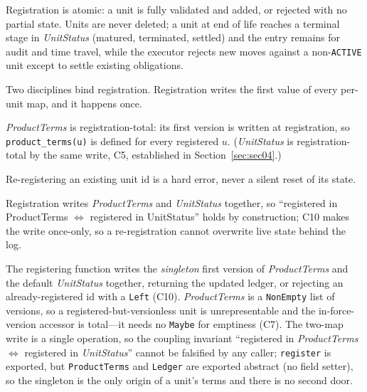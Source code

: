 Registration is atomic: a unit is fully validated and added, or rejected with no partial state. Units are never deleted; a unit at end of life reaches a terminal stage in \emph{UnitStatus} (matured, terminated, settled) and the entry remains for audit and time travel, while the executor rejects new moves against a non-\texttt{ACTIVE} unit except to settle existing obligations.

Two disciplines bind registration. Registration writes the first value of every per-unit map, and it happens once.

\begin{condition}
\label{cond:C7}
\sloppy
\emph{ProductTerms} is registration-total: its first version is written at registration, so \texttt{product\_terms(u)} is defined for every registered $u$. (\emph{UnitStatus} is registration-total by the same write, C5, established in Section~\ref{sec:sec04}.)
\end{condition}

\begin{condition}[C10: no re-registration]
\label{cond:C10}
Re-registering an existing unit id is a hard error, never a silent reset of its state.
\end{condition}

Registration writes \emph{ProductTerms} and \emph{UnitStatus} together, so ``registered in ProductTerms $\iff$ registered in UnitStatus'' holds by construction; C10 makes the write once-only, so a re-registration cannot overwrite live state behind the log.

The registering function writes the \emph{singleton} first version of \emph{ProductTerms} and the default \emph{UnitStatus} together, returning the updated ledger, or rejecting an already-registered id with a \texttt{Left} (C10). \emph{ProductTerms} is a \texttt{NonEmpty} list of versions, so a registered-but-versionless unit is unrepresentable and the in-force-version accessor is total---it needs no \texttt{Maybe} for emptiness (C7). The two-map write is a single operation, so the coupling invariant ``registered in \emph{ProductTerms} $\iff$ registered in \emph{UnitStatus}'' cannot be falsified by any caller; \texttt{register} is exported, but \texttt{ProductTerms} and \texttt{Ledger} are exported abstract (no field setter), so the singleton is the only origin of a unit's terms and there is no second door.

